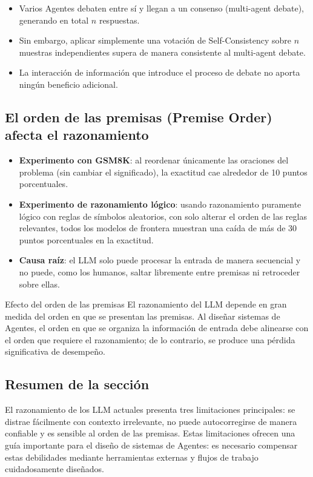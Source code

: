 \documentclass[a4paper]{article}
\begin{document}
\begin{itemize}
    \item Varios Agentes debaten entre sí y llegan a un consenso (multi-agent debate), generando en total $n$ respuestas.
    \item Sin embargo, aplicar simplemente una votación de Self-Consistency sobre $n$ muestras independientes supera de manera consistente al multi-agent debate.
    \item La interacción de información que introduce el proceso de debate no aporta ningún beneficio adicional.
\end{itemize}

\subsection{El orden de las premisas (Premise Order) afecta el razonamiento}

\begin{itemize}
    \item \textbf{Experimento con GSM8K}: al reordenar únicamente las oraciones del problema (sin cambiar el significado), la exactitud cae alrededor de 10 puntos porcentuales.
    \item \textbf{Experimento de razonamiento lógico}: usando razonamiento puramente lógico con reglas de símbolos aleatorios, con solo alterar el orden de las reglas relevantes, todos los modelos de frontera muestran una caída de más de 30 puntos porcentuales en la exactitud.
    \item \textbf{Causa raíz}: el LLM solo puede procesar la entrada de manera secuencial y no puede, como los humanos, saltar libremente entre premisas ni retroceder sobre ellas.
\end{itemize}

\begin{warningbox}{Efecto del orden de las premisas}
El razonamiento del LLM depende en gran medida del orden en que se presentan las premisas. Al diseñar sistemas de Agentes, el orden en que se organiza la información de entrada debe alinearse con el orden que requiere el razonamiento; de lo contrario, se produce una pérdida significativa de desempeño.
\end{warningbox}

\subsection{Resumen de la sección}

El razonamiento de los LLM actuales presenta tres limitaciones principales: se distrae fácilmente con contexto irrelevante, no puede autocorregirse de manera confiable y es sensible al orden de las premisas. Estas limitaciones ofrecen una guía importante para el diseño de sistemas de Agentes: es necesario compensar estas debilidades mediante herramientas externas y flujos de trabajo cuidadosamente diseñados.
\end{document}
